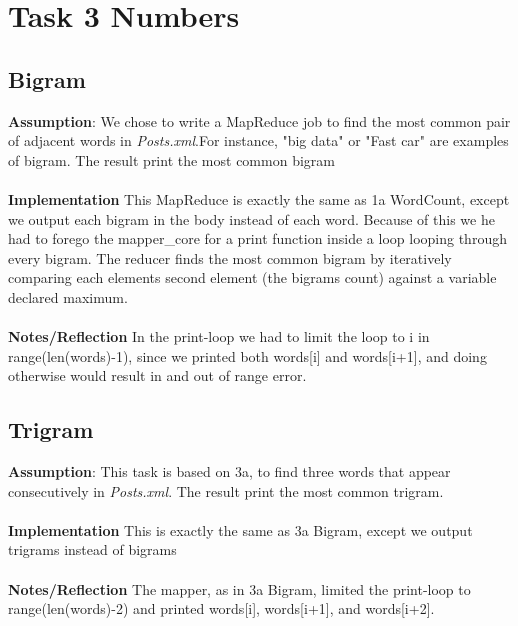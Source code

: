 \documentclass[fleqn,10pt]{wlscirep}
\begin{document}
\section{Task 3 Numbers}

\subsection{Bigram }
\textbf{Assumption}: We chose to write a MapReduce job to find the most common pair of adjacent words in \textit{Posts.xml}.For instance, "big data" or "Fast car" are examples of bigram. The result print the most common bigram   \\\\
\textbf{Implementation} This MapReduce is exactly the same as 1a WordCount, except we output each bigram in the body instead of each word. Because of this we he had to forego the mapper\_core for a print function inside a loop looping through every bigram. The reducer finds the most common bigram by iteratively comparing each elements second element (the bigrams count) against a variable declared maximum. \\ \\
\textbf{Notes/Reflection} In the print-loop we had to limit the loop to i in range(len(words)-1), since we printed both words[i] and words[i+1], and doing otherwise would result in and out of range error.


\subsection{Trigram}
\textbf{Assumption}: This task is based on 3a, to find three words that appear consecutively in \textit{Posts.xml}. The result print the most common trigram.  \\ \\
\textbf{Implementation} This is exactly the same as 3a Bigram, except we output trigrams instead of bigrams \\ \\
\textbf{Notes/Reflection} The mapper, as in 3a Bigram, limited the print-loop to range(len(words)-2) and printed words[i], words[i+1], and words[i+2].

\end{document}
